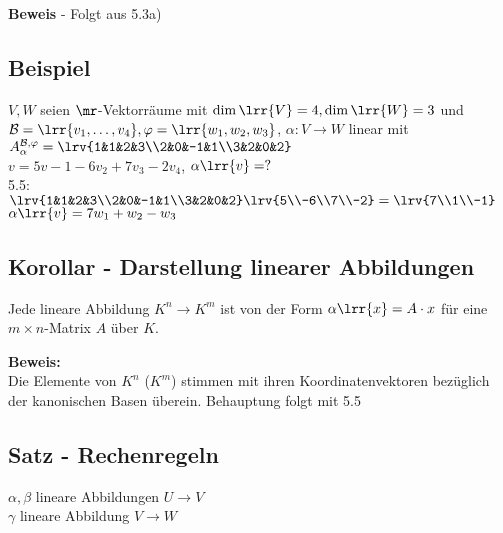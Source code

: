 
	\textbf{Beweis} - Folgt aus 5.3a)

\subsection{Beispiel}
	$V,W$ seien $\mr$-Vektorräume mit $\dim\lrr{V}=4, \dim\lrr{W}=3$ und $\mathcal{B}=\lrr{v_1,\dots,v_4},\varphi=\lrr{w_1,w_2,w_3}$, $\alpha:V\rightarrow W$ linear mit \\
	$A_\alpha^{\mathcal{B},\varphi}=\lrv{1&1&2&3\\2&0&-1&1\\3&2&0&2}$\\
	$v=5v-1-6v_2+7v_3-2v_4$, $\alpha\lrr{v}=?$\\
	5.5:$\lrv{1&1&2&3\\2&0&-1&1\\3&2&0&2}\lrv{5\\-6\\7\\-2}=\lrv{7\\1\\-1}$\\
	$\alpha\lrr{v}=7w_1+w_2-w_3$
	
\subsection{Korollar - Darstellung linearer Abbildungen}
	Jede lineare Abbildung $K^n\rightarrow K^m$ ist von der Form $\alpha\lrr{x}=A\cdot x$ für eine $m\times n$-Matrix $A$ über $K$.

	\textbf{Beweis:}\\
	Die Elemente von $K^n$ ($K^m$) stimmen mit ihren Koordinatenvektoren bezüglich der kanonischen Basen überein. Behauptung folgt mit 5.5

\subsection{Satz - Rechenregeln}
	$\alpha,\beta$ lineare Abbildungen $U\rightarrow V$\\
	$\gamma$ lineare Abbildung $V\rightarrow W$

